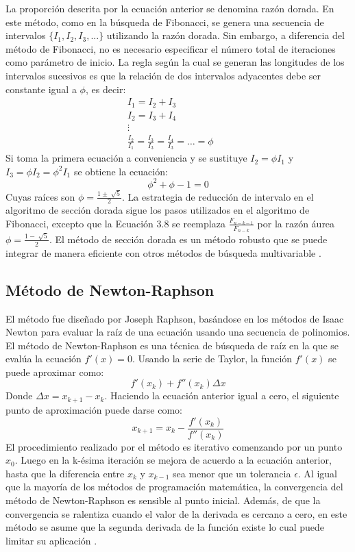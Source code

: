 La proporción descrita por la ecuación anterior se denomina razón dorada. En este método, como en la búsqueda de Fibonacci, se genera una secuencia de intervalos $\{I_1, I_2, I_3, ...\}$ utilizando la razón dorada. Sin embargo, a diferencia del método de Fibonacci, no es necesario especificar el número total de iteraciones como parámetro de inicio. La regla según la cual se generan las longitudes de los intervalos sucesivos es que la relación de dos intervalos adyacentes debe ser constante igual a $\phi$, es decir:
\begin{equation}
\begin{aligned}
 I_1 = I_2 + I_3 & &\\
 I_2 = I_3 + I_4 & &\\
 \vdots & &
\\
\frac{I_2}{I_{1}}=\frac{I_3}{I_{3}}= \frac{I_4}{I_{3}}=\ldots=\phi
\end{aligned}
\end{equation}
Si toma la primera ecuación a conveniencia y se sustituye $I_2 =  \phi I_1 $ y  $I_3 = \phi I_2=\phi^2 I_1$ se obtiene la ecuación:
\begin{equation}
 \phi^2 + \phi -1=0
\end{equation}
Cuyas raíces son $\phi=\frac{1 \pm \sqrt[]{5}}{2}$. 
La estrategia de reducción de intervalo en el algoritmo de sección dorada sigue los pasos utilizados en el algoritmo de Fibonacci, excepto que la Ecuación 3.8 se reemplaza $\frac{F_{n-k-1}}{ F_{n-k}}$ por la razón áurea $\phi=\frac{1 - \sqrt[]{5}}{2}$. El método de sección dorada es un método robusto que se puede integrar de manera eficiente con otros métodos de búsqueda multivariable \cite{belegundu_optimization_2011}.
\subsection{Método de Newton-Raphson}
El método fue diseñado por Joseph Raphson, basándose en los métodos de Isaac Newton para evaluar la raíz de una ecuación usando una secuencia de polinomios.  El método de Newton-Raphson es una técnica de búsqueda de raíz en la que se evalúa la ecuación $f'(x) = 0$. Usando la serie de Taylor, la función $f'(x)$ se puede aproximar como:
\begin{equation}
 f'(x_k) + f''(x_k)\Delta x
\end{equation}
Donde $\Delta x=  x_{k+1}-x_k$. Haciendo la ecuación anterior igual a cero, el siguiente punto de aproximación puede darse como:
\begin{equation}
 x_{k+1}=x_k - \frac{f'(x_k)}{f''(x_k)} 
\end{equation}
El procedimiento realizado por el método es iterativo comenzando por un punto $x_0$. Luego en la k-ésima iteración se mejora de acuerdo a la ecuación anterior, hasta que la diferencia entre $x_k$  y $x_{k-1}$ sea menor que un tolerancia $\epsilon$. Al igual que la mayoría de los métodos de programación matemática, la convergencia del método de Newton-Raphson es sensible al punto inicial. Además, de que la convergencia se ralentiza cuando el valor de la derivada es cercano a cero, en este método se asume que la segunda derivada de la función existe lo cual puede limitar su aplicación \cite{rao_engineering_2009}.
